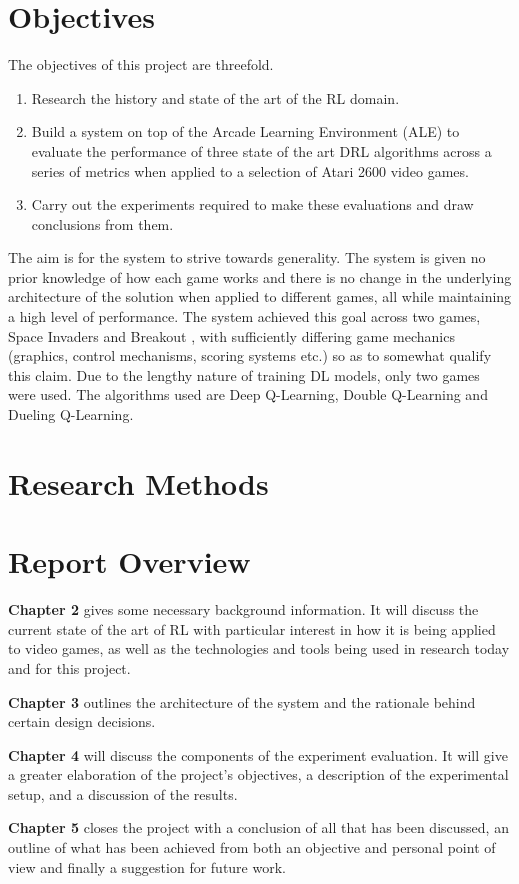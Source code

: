 \section{Objectives}
The objectives of this project are threefold. 
\begin{enumerate}
	\item Research the history and state of the art of the RL domain.
	\item Build a system on top of the Arcade Learning Environment (ALE) \cite{DBLP:journals/corr/abs-1207-4708} to evaluate the performance of three state of the art DRL algorithms across a series of metrics when applied to a selection of Atari 2600 video games. 
	\item Carry out the experiments required to make these evaluations and draw conclusions from them.
\end{enumerate}
The aim is for the system to strive towards generality. The system is given no prior knowledge of how each game works and there is no change in the underlying architecture of the solution when applied to different games, all while maintaining a high level of performance. The system achieved this goal across two games, Space Invaders \cite{space-invaders} and Breakout \cite{breakout}, with sufficiently differing game mechanics (graphics, control mechanisms, scoring systems etc.) so as to somewhat qualify this claim. Due to the lengthy nature of training DL models, only two games were used. The algorithms used are Deep Q-Learning, Double Q-Learning and Dueling Q-Learning.
\section{Research Methods}

\section{Report Overview}
\textbf{Chapter 2} gives some necessary background information. It will discuss the current state of the art of RL with particular interest in how it is being applied to video games, as well as the technologies and tools being used in research today and for this project.

\textbf{Chapter 3} outlines the architecture of the system and the rationale behind certain design decisions.

\textbf{Chapter 4} will discuss the components of the experiment evaluation. It will give a greater elaboration of the project's objectives, a description of the experimental setup, and a discussion of the results.

\textbf{Chapter 5} closes the project with a conclusion of all that has been discussed, an outline of what has been achieved from both an objective and personal point of view and finally a suggestion for future work.
